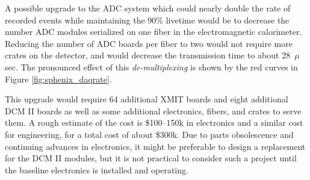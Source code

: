 A possible upgrade to the ADC system which could nearly double the
rate of recorded events while maintaining the 90\% livetime would be
to decrease the number ADC modules serialized on one fiber in the
electromagnetic calorimeter.  Reducing the number of ADC boards per
fiber to two would not require more crates on the detector, and would
decrease the transmission time to about 28~$\mu$sec.  The pronounced
effect of this \emph{de-multiplexing} is shown by the red curves in
Figure \ref{fig:sphenix_daqrate}.

This upgrade would require 64 additional XMIT boards and eight
additional DCM II boards as well as some additional electronics,
fibers, and crates to serve them.  A rough estimate of the cost is
\$100--150k in electronics and a similar cost for engineering, for a
total cost of about \$300k.  Due to parts obsolescence and continuing
advances in electronics, it might be preferable to design a
replacement for the DCM II modules, but it is not practical to
consider such a project until the baseline electronics is installed
and operating.




